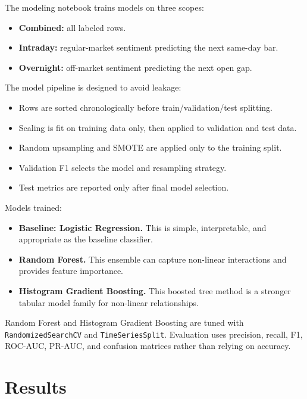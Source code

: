 \documentclass[11pt]{article}
\begin{document}
The modeling notebook  trains models on three scopes:

\begin{itemize}
    \item \textbf{Combined:} all labeled rows.
    \item \textbf{Intraday:} regular-market sentiment predicting the next same-day bar.
    \item \textbf{Overnight:} off-market sentiment predicting the next open gap.
\end{itemize}

The model pipeline is designed to avoid leakage:

\begin{itemize}
    \item Rows are sorted chronologically before train/validation/test splitting.
    \item Scaling is fit on training data only, then applied to validation and test data.
    \item Random upsampling and SMOTE are applied only to the training split.
    \item Validation F1 selects the model and resampling strategy.
    \item Test metrics are reported only after final model selection.
\end{itemize}

Models trained:

\begin{itemize}
    \item \textbf{Baseline: Logistic Regression.} This is simple, interpretable, and appropriate as the baseline classifier.
    \item \textbf{Random Forest.} This ensemble can capture non-linear interactions and provides feature importance.
    \item \textbf{Histogram Gradient Boosting.} This boosted tree method is a stronger tabular model family for non-linear relationships.
\end{itemize}

Random Forest and Histogram Gradient Boosting are tuned with \texttt{RandomizedSearchCV} and \texttt{TimeSeriesSplit}. Evaluation uses precision, recall, F1, ROC-AUC, PR-AUC, and confusion matrices rather than relying on accuracy.

\section{Results}
\end{document}
